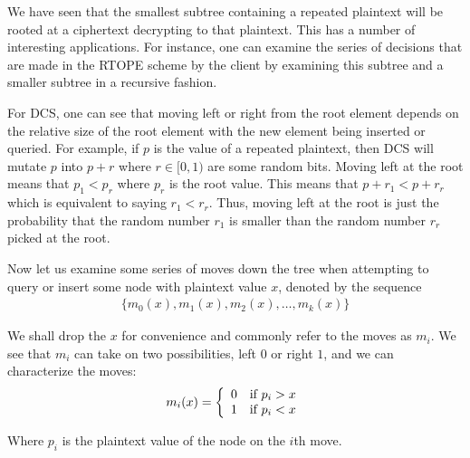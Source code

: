 \documentclass[12pt]{article}
\begin{document}
We have seen that the smallest subtree containing a repeated plaintext will be rooted at a ciphertext decrypting to that plaintext. This has a number of interesting applications. For instance, one can examine the series of decisions that are made in the RTOPE scheme by the client by examining this subtree and a smaller subtree in a recursive fashion.

For DCS, one can see that moving left or right from the root element depends on the relative size of the root element with the new element being inserted or queried. For example, if $p$ is the value of a repeated plaintext, then DCS will mutate $p$ into $p + r$ where $r \in [0,1)$ are some random bits. Moving left at the root means that $p_1 < p_r$ where $p_r$ is the root value. This means that $p + r_1 < p + r_r$ which is equivalent to saying $r_1 < r_r$. Thus, moving left at the root is just the probability that the random number $r_1$ is smaller than the random number $r_r$ picked at the root.

  Now let us examine some series of moves down the tree when attempting to query or insert some node with plaintext value $x$, denoted by the sequence
  \begin{eqnarray}
    \{m_0(x), m_1(x), m_2(x), \ldots, m_k(x)\}
  \end{eqnarray}

  We shall drop the $x$ for convenience and commonly refer to the moves as $m_i$. We see that $m_i$ can take on two possibilities, left $0$ or right $1$, and we can characterize the moves:
  \begin{eqnarray}
    m_i(x) = \left\{ \begin{array}{l l}
        0 & \textrm{if } p_i > x \\
        1 & \textrm{if } p_i < x
      \end{array} \right.
  \end{eqnarray}

  Where $p_i$ is the plaintext value of the node on the $i$th move.
\end{document}
